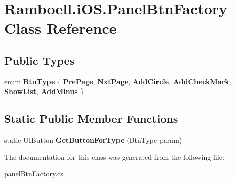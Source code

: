 \hypertarget{class_ramboell_1_1i_o_s_1_1_panel_btn_factory}{}\section{Ramboell.\+i\+O\+S.\+Panel\+Btn\+Factory Class Reference}
\label{class_ramboell_1_1i_o_s_1_1_panel_btn_factory}
\subsection*{Public Types}
\begin{DoxyCompactItemize}
\item 
\mbox{\label{class_ramboell_1_1i_o_s_1_1_panel_btn_factory_a8f133a5fbbf4c069707345ac6fe411e6}} 
enum {\bfseries Btn\+Type} \{ \newline
{\bfseries Pre\+Page}, 
{\bfseries Nxt\+Page}, 
{\bfseries Add\+Circle}, 
{\bfseries Add\+Check\+Mark}, 
\newline
{\bfseries Show\+List}, 
{\bfseries Add\+Minus}
 \}
\end{DoxyCompactItemize}
\subsection*{Static Public Member Functions}
\begin{DoxyCompactItemize}
\item 
\mbox{\label{class_ramboell_1_1i_o_s_1_1_panel_btn_factory_a316b40da92c98e8096b49f332626e611}} 
static U\+I\+Button {\bfseries Get\+Button\+For\+Type} (Btn\+Type param)
\end{DoxyCompactItemize}


The documentation for this class was generated from the following file\+:\begin{DoxyCompactItemize}
\item 
panel\+Btn\+Factory.\+cs\end{DoxyCompactItemize}
